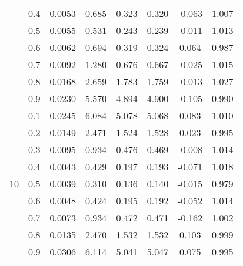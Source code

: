 \documentclass[11pt,a4paper]{report}
\begin{document}
\begin{longtable}{ | c | c || c | c | c | c | c | c | }
 & 0.4 & 0.0053 & 0.685 & 0.323 & 0.320 & -0.063 & 1.007 \\
 & 0.5 & 0.0055 & 0.531 & 0.243 & 0.239 & -0.011 & 1.013 \\
 & 0.6 & 0.0062 & 0.694 & 0.319 & 0.324 & 0.064 & 0.987 \\
 & 0.7 & 0.0092 & 1.280 & 0.676 & 0.667 & -0.025 & 1.015 \\
 & 0.8 & 0.0168 & 2.659 & 1.783 & 1.759 & -0.013 & 1.027 \\
 & 0.9 & 0.0230 & 5.570 & 4.894 & 4.900 & -0.105 & 0.990 \\
 \hline
\multirow{9}{*}{10} & 0.1 & 0.0245 & 6.084 & 5.078 & 5.068 & 0.083 & 1.010 \\
 & 0.2 & 0.0149 & 2.471 & 1.524 & 1.528 & 0.023 & 0.995 \\
 & 0.3 & 0.0095 & 0.934 & 0.476 & 0.469 & -0.008 & 1.014 \\
 & 0.4 & 0.0043 & 0.429 & 0.197 & 0.193 & -0.071 & 1.018 \\
 & 0.5 & 0.0039 & 0.310 & 0.136 & 0.140 & -0.015 & 0.979 \\
 & 0.6 & 0.0048 & 0.424 & 0.195 & 0.192 & -0.052 & 1.014 \\
 & 0.7 & 0.0073 & 0.934 & 0.472 & 0.471 & -0.162 & 1.002 \\
 & 0.8 & 0.0135 & 2.470 & 1.532 & 1.532 & 0.103 & 0.999 \\
 & 0.9 & 0.0306 & 6.114 & 5.041 & 5.047 & 0.075 & 0.995 \\
 \hline
\hline
\end{longtable}
\end{document}
